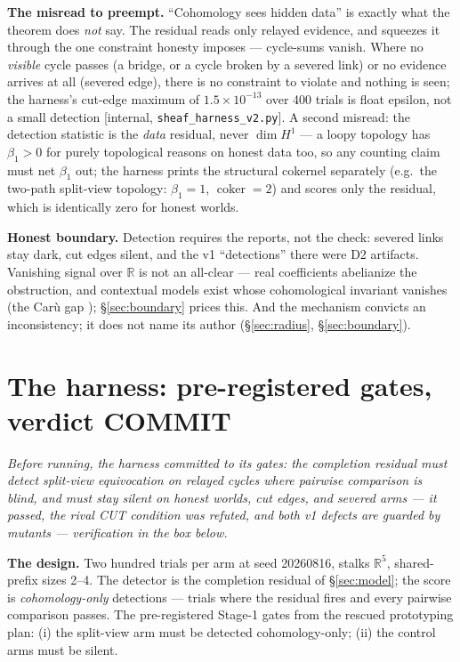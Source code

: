 \documentclass[11pt,a4paper]{article}
\newcommand{\onebreath}[1]{\begin{center}\emph{#1}\end{center}}
\begin{document}
\textbf{The misread to preempt.} ``Cohomology sees hidden data'' is exactly what the theorem does \emph{not} say. The
residual reads only relayed evidence, and squeezes it through the one constraint honesty imposes --- cycle-sums vanish. Where
no \emph{visible} cycle passes (a bridge, or a cycle broken by a severed link) or no evidence arrives at all (severed edge),
there is no constraint to violate and nothing is seen;
the harness's cut-edge maximum of $1.5\times10^{-13}$ over 400 trials is float epsilon, not a small detection
[internal, \texttt{sheaf\_harness\_v2.py}]. A second misread: the detection statistic is the \emph{data} residual, never
$\dim H^1$ --- a loopy topology has $\beta_1>0$ for purely topological reasons on honest data too, so any counting claim
must net $\beta_1$ out; the harness prints the structural cokernel separately (e.g.\ the two-path split-view topology:
$\beta_1=1$, $\operatorname{coker}=2$) and scores only the residual, which is identically zero for honest worlds.



\begin{boundary}
\textbf{Honest boundary.} Detection requires the reports, not the check: severed links stay dark, cut edges silent, and the
v1 ``detections'' there were D2 artifacts. Vanishing signal over $\mathbb{R}$ is not an all-clear --- real coefficients
abelianize the obstruction, and contextual models exist whose cohomological invariant vanishes (the Car\`u gap
\cite{caru}); \S\ref{sec:boundary} prices this. And the mechanism convicts an inconsistency; it does not name its author
(\S\ref{sec:radius}, \S\ref{sec:boundary}).
\end{boundary}

\section{The harness: pre-registered gates, verdict COMMIT}\label{sec:harness}

\onebreath{Before running, the harness committed to its gates: the completion residual must detect
split-view equivocation on relayed cycles where pairwise comparison is blind, and must stay silent on honest worlds, cut
edges, and severed arms --- it passed, the rival CUT condition was refuted, and both v1 defects are guarded by mutants ---
verification in the box below.}

\textbf{The design.} Two hundred trials per arm at seed 20260816, stalks $\mathbb{R}^5$, shared-prefix sizes 2--4. The
detector is the completion residual of \S\ref{sec:model}; the score is \emph{cohomology-only} detections --- trials where
the residual fires and every pairwise comparison passes. The pre-registered Stage-1 gates from the rescued prototyping plan:
(i) the split-view arm must be detected cohomology-only; (ii) the control arms must be silent.
\end{document}

